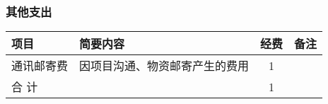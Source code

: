 \subsubsection{其他支出}
\begin{table}[H]
	\centering
	\begin{tabular}{m{3cm} m{7.5cm} cc}
		\toprule
		项目     & 简要内容     & 经费 & 备注 \\
		\midrule
		通讯邮寄费 & 因项目沟通、物资邮寄产生的费用 & 1   &      \\
		合 计        &              & 1      \\
		\bottomrule
	\end{tabular}
\end{table}





